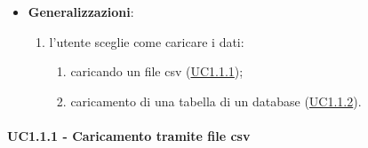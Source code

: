 \begin{itemize}
\begin{enumerate}
        \end{enumerate}  
    \item \textbf{Generalizzazioni}:
        \begin{enumerate}
            \item l'utente sceglie come caricare i dati:
                \begin{enumerate}
                    \item caricando un file csv (\hyperref[uc1.1.1]{UC1.1.1});
                    \item caricamento di una tabella di un database (\hyperref[uc1.1.2]{UC1.1.2}).
                \end{enumerate}
        \end{enumerate}  
    \end{itemize}
    
    \paragraph{UC1.1.1 - Caricamento tramite file csv}
    \label{uc1.1.1}
    
